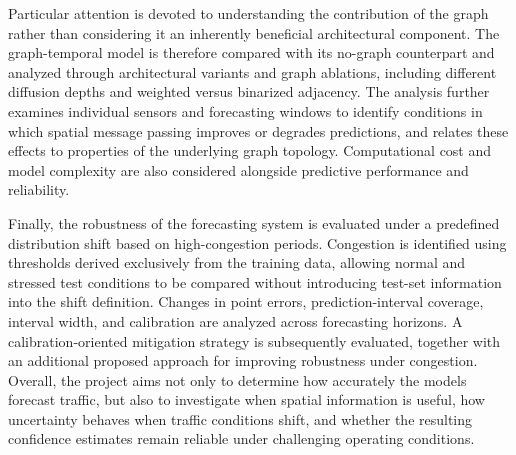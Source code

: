Particular attention is devoted to understanding the contribution of the graph rather than considering it an inherently
beneficial architectural component.
The graph-temporal model is therefore compared with its no-graph counterpart and analyzed through architectural variants
and graph ablations, including different diffusion depths and weighted versus binarized adjacency.
The analysis further examines individual sensors and forecasting windows to identify conditions in which spatial message
passing improves or degrades predictions, and relates these effects to properties of the underlying graph topology.
Computational cost and model complexity are also considered alongside predictive performance and reliability.


Finally, the robustness of the forecasting system is evaluated under a predefined distribution shift based on high-congestion periods.
Congestion is identified using thresholds derived exclusively from the training data, allowing normal and stressed test
conditions to be compared without introducing test-set information into the shift definition.
Changes in point errors, prediction-interval coverage, interval width, and calibration are analyzed across forecasting horizons.
A calibration-oriented mitigation strategy is subsequently evaluated, together with an additional proposed approach for
improving robustness under congestion.
Overall, the project aims not only to determine how accurately the models forecast traffic, but also to investigate when
spatial information is useful, how uncertainty behaves when traffic conditions shift, and whether the resulting confidence
estimates remain reliable under challenging operating conditions.


